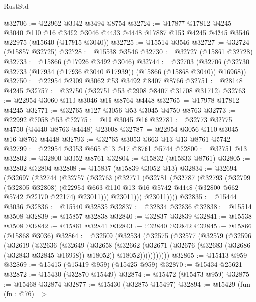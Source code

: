 \begin{lexlean}{RustStd}
\begin{coremodule}
@32706 := @22962 @3042 @3494 @8754
@32724 := @17877
    @17812
    @4245
    @3040
    @110
    @16
    @3492
    @3046
    @4433
    @4448
    @17887
    @153
    @4245
    @4245
    @3546
    @22975
    (@15640 (@17915 @3040))
@32725 := @15514 @3546
@32727 := @32724 (@15857 @32725)
@32728 := @15538 @3546
@32730 := @32727 (@15861 @32728)
@32733 := @15866 (@17926 @3492 @3046)
@32744 := @32703
    (@32706 (@32730 @32733 (@17934 (@17936 @3040 @17939)) (@15866 (@15868 @3040)) @16968))
@32750 := @22954 @2909 @3062 @53 @3492 @8407 @8766
@32751 := @28148 @4245
@32757 := @32750 (@32751 @53 @2908 @8407 @31708 @31712)
@32763 := @22954 @3060 @110 @3046 @16 @8764 @4448
@32765 := @17978 @17812 @4245
@32771 := @32765 @127 @3056 @53 @3045 @4750 @8763
@32773 := @22992 @3058 @53
@32775 := @10 @3045 @16
@32781 := @32773 @32775 @4750 (@4440 @8763 @4448) @23008
@32787 := @22954 @3056 @110 @3045 @16 @8763 @4448
@32793 := @32765 @3053 @663 @13 @13 @8761 @5742
@32799 := @22954 @3053 @665 @13 @17 @8761 @5744
@32800 := @32751 @13
@32802 := @32800 @3052 @8761
@32804 := @15832 (@15833 @8761)
@32805 := @32802 @32804
@32808 := @15837 (@15839 @3052 @13)
@32834 := @32694
    (@32697
      (@32744
        (@32757
          (@32763
            (@32771
              (@32781
                (@32787
                  (@32793
                    (@32799
                      (@32805 @32808)
                      (@22954
                        @663
                        @110
                        @13
                        @16
                        @5742
                        @4448
                        (@32800 @662 @5742 @22170 @22174)
                        @23011)))
                  @23011)))
            @23011))))
@32835 := @15444 @3036
@32836 := @15640 @32835
@32837 := @32834 @32836
@32838 := @15514 @3508
@32839 := @15857 @32838
@32840 := @32837 @32839
@32841 := @15538 @3508
@32842 := @15861 @32841
@32843 := @32840 @32842
@32845 := @15866 (@15868 @3036)
@32864 := @32509
    (@32534
      (@32575
        (@32577
          (@32579
            (@32596
              (@32619
                (@32636
                  (@32649
                    (@32658
                      (@32662
                        (@32671
                          (@32676 (@32683 (@32686 (@32843 @32845 @16968)) @18052))
                          @18052)))))))))))
@32865 := @15413 @959
@32869 := @15415 (@15419 @959) (@15425 @959)
@32870 := @15434 @25621
@32872 := @15430 (@32870 @15449)
@32874 := @15472 (@15473 @959)
@32875 := @15468 @32874
@32877 := @15430 (@32875 @15497)
@32894 := @15429
    (fun (fn : @76) =>

\end{coremodule}
\end{lexlean}
